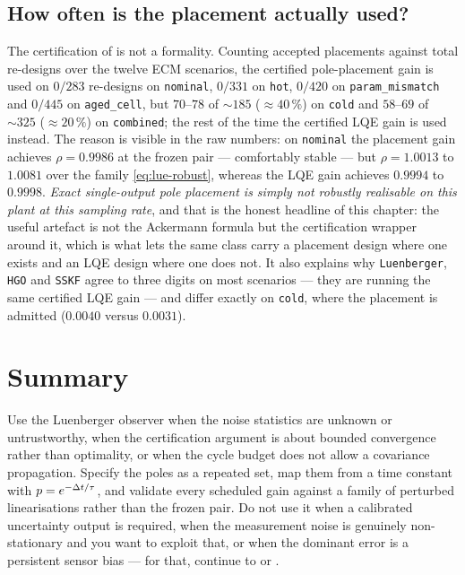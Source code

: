 \subsection*{How often is the placement actually used?}
The certification of  is not a formality.  Counting accepted placements
against total re-designs over the twelve ECM scenarios, the certified pole-placement gain is used
on $0/283$ re-designs on \texttt{nominal}, $0/331$ on \texttt{hot}, $0/420$ on
\texttt{param\_mismatch} and $0/445$ on \texttt{aged\_cell}, but $70$--$78$ of $\sim\!185$
($\approx 40\,\%$) on \texttt{cold} and $58$--$69$ of $\sim\!325$ ($\approx 20\,\%$) on
\texttt{combined}; the rest of the time the certified LQE gain is used instead.  The reason is
visible in the raw numbers: on \texttt{nominal} the placement gain achieves $\rho = 0.9986$ at the
frozen pair --- comfortably stable --- but $\rho = 1.0013$ to $1.0081$ over the family
\eqref{eq:lue-robust}, whereas the LQE gain achieves $0.9994$ to $0.9998$.  \emph{Exact
single-output pole placement is simply not robustly realisable on this plant at this sampling
rate}, and that is the honest headline of this chapter: the useful artefact is not the Ackermann
formula but the certification wrapper around it, which is what lets the same class carry a
placement design where one exists and an LQE design where one does not.  It also explains why
\texttt{Luenberger}, \texttt{HGO} and \texttt{SSKF} agree to three digits on most scenarios ---
they are running the same certified LQE gain --- and differ exactly on \texttt{cold}, where the
placement is admitted ($0.0040$ versus $0.0031$).

\section{Summary}
Use the Luenberger observer when the noise statistics are unknown or untrustworthy, when the
certification argument is about bounded convergence rather than optimality, or when the cycle
budget does not allow a covariance propagation.  Specify the poles as a repeated set, map them
from a time constant with $p=e^{-\Delta t/\tau}$, and validate every scheduled gain against a family
of perturbed linearisations rather than the frozen pair.  Do not use it when a calibrated
uncertainty output is required, when the measurement noise is genuinely non-stationary and you
want to exploit that, or when the dominant error is a persistent sensor bias --- for that,
continue to  or .
